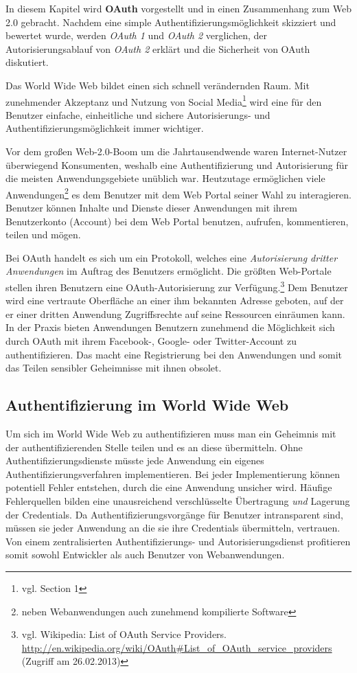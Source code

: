 \documentclass[12pt,a4paper,pointednumbers,abstracton]{scrartcl}
\begin{document}
In diesem Kapitel wird \textbf{OAuth} vorgestellt und in einen Zusammenhang zum Web 2.0 gebracht.
Nachdem eine simple Authentifizierungsmöglichkeit skizziert und bewertet wurde, werden \emph{OAuth 1} und \emph{OAuth 2} verglichen, der Autorisierungsablauf von \emph{OAuth 2} erklärt und die Sicherheit von OAuth diskutiert.

Das World Wide Web bildet einen sich schnell verändernden Raum.
Mit zunehmender Akzeptanz und Nutzung von Social Media\footnote{vgl. \cite{KH10} Section 1} wird eine für den Benutzer einfache, einheitliche und sichere Autorisierungs- und Authentifizierungsmöglichkeit immer wichtiger.

Vor dem großen Web-2.0-Boom um die Jahrtausendwende waren Internet-Nutzer überwiegend Konsumenten, weshalb eine Authentifizierung und Autorisierung für die meisten Anwendungsgebiete unüblich war.
Heutzutage ermöglichen viele Anwendungen\footnote{neben Webanwendungen auch zunehmend kompilierte Software} es dem Benutzer mit dem Web Portal seiner Wahl zu interagieren.
Benutzer können Inhalte und Dienste dieser Anwendungen mit ihrem Benutzerkonto (Account) bei dem Web Portal benutzen, aufrufen, kommentieren, teilen und mögen.

Bei OAuth handelt es sich um ein Protokoll, welches eine \emph{Autorisierung dritter Anwendungen} im Auftrag des Benutzers ermöglicht.
Die größten Web-Portale stellen ihren Benutzern eine OAuth-Autorisierung zur Verfügung.\footnote{vgl. Wikipedia: List of OAuth Service Providers. \url{http://en.wikipedia.org/wiki/OAuth\#List_of_OAuth_service_providers} (Zugriff am 26.02.2013)}
Dem Benutzer wird eine vertraute Oberfläche an einer ihm bekannten Adresse geboten, auf der er einer dritten Anwendung Zugriffsrechte auf seine Ressourcen einräumen kann.
In der Praxis bieten Anwendungen Benutzern zunehmend die Möglichkeit sich durch OAuth mit ihrem Facebook-, Google- oder Twitter-Account zu authentifizieren.
Das macht eine Registrierung bei den Anwendungen und somit das Teilen sensibler Geheimnisse mit ihnen obsolet.

\subsection{Authentifizierung im World Wide Web}

Um sich im World Wide Web zu authentifizieren muss man ein Geheimnis mit der authentifizierenden Stelle teilen und es an diese übermitteln.
Ohne Authentifizierungsdienste müsste jede Anwendung ein eigenes Authentifizierungsverfahren implementieren.
Bei jeder Implementierung können potentiell Fehler entstehen, durch die eine Anwendung unsicher wird.
Häufige Fehlerquellen bilden eine unausreichend verschlüsselte Übertragung \emph{und} Lagerung der Credentials.
Da Authentifizierungsvorgänge für Benutzer intransparent sind, müssen sie jeder Anwendung an die sie ihre Credentials übermitteln, vertrauen.
Von einem zentralisierten Authentifizierungs- und Autorisierungsdienst profitieren somit sowohl Entwickler als auch Benutzer von Webanwendungen.
\end{document}
